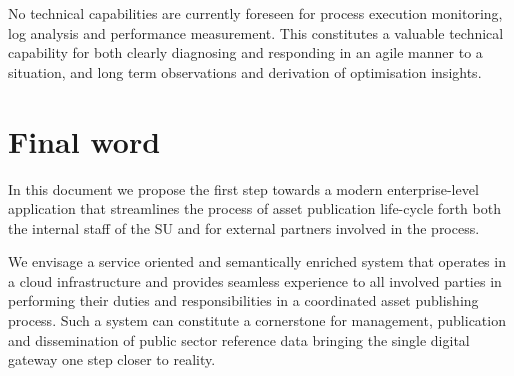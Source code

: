 	No technical capabilities are currently foreseen for process execution monitoring, log analysis and performance measurement. This constitutes a valuable technical capability for both clearly diagnosing and responding in an agile manner to a situation, and long term observations and derivation of optimisation insights.
	
    \section{Final word}
    In this document we propose the first step towards a modern enterprise-level application that streamlines the process of asset publication life-cycle forth both the internal staff of the SU and for external partners involved in the process. 
    
    We envisage a service oriented and semantically enriched system that operates in a cloud infrastructure and provides seamless experience to all involved parties in performing their duties and responsibilities in a  coordinated asset publishing process. Such a system can constitute a cornerstone for management, publication and dissemination of public sector reference data bringing the single digital gateway one step closer to reality. 
    
	
 
 
 
 
 
